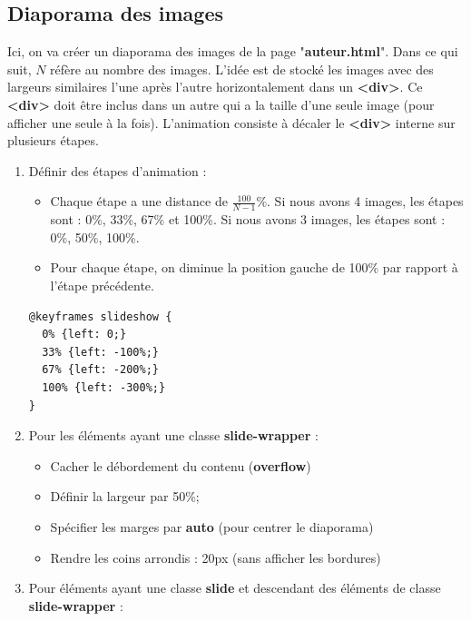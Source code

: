 \documentclass[11pt, a4paper]{article}
\begin{document}
\subsection*{Diaporama des images}

Ici, on va créer un diaporama des images de la page "\textbf{auteur.html}". 
Dans ce qui suit, $N$ réfère au nombre des images. 
L'idée est de stocké les images avec des largeurs similaires l'une après l'autre horizontalement dans un \textbf{<div>}. 
Ce \textbf{<div>} doit être inclus dans un autre qui a la taille d'une seule image (pour afficher une seule à la fois).
L'animation consiste à décaler le \textbf{<div>} interne sur plusieurs étapes.
\begin{enumerate}
	\item Définir des étapes d'animation :
	\begin{multicols}{2}
	\begin{itemize}
		\item Chaque étape a une distance de $\frac{100}{N-1}\%$. 
		Si nous avons 4 images, les étapes sont : 0\%, 33\%, 67\% et 100\%.
		Si nous avons 3 images, les étapes sont : 0\%, 50\%, 100\%.
		\item Pour chaque étape, on diminue la position gauche de 100\% par rapport à l'étape précédente.
	\end{itemize} 
	\end{multicols}
\begin{verbatim}
@keyframes slideshow {
  0% {left: 0;}
  33% {left: -100%;}
  67% {left: -200%;}
  100% {left: -300%;}
}
\end{verbatim}
	\item Pour les éléments ayant une classe \textbf{slide-wrapper} :
	\begin{multicols}{2}
	\begin{itemize}
		\item Cacher le débordement du contenu (\textbf{overflow})
		\item Définir la largeur par 50\%;
		\item Spécifier les marges par \textbf{auto} (pour centrer le diaporama)
		\item Rendre les coins arrondis : 20px (sans afficher les bordures)
	\end{itemize} 
	\end{multicols}
	\item Pour éléments ayant une classe \textbf{slide} et descendant des éléments de classe \textbf{slide-wrapper} :
	\begin{multicols}{2}

\end{multicols}
\end{enumerate}
\end{document}
